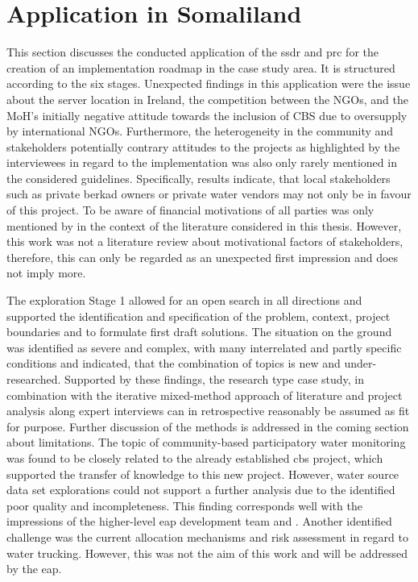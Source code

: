 \section{Application in Somaliland}

This section discusses the conducted application of the \acrshort{ssdr} and \acrshort{prc} for the creation of an implementation roadmap in the case study area. It is structured according to the six stages. Unexpected findings in this application were the issue about the server location in Ireland, the competition between the NGOs, and the MoH's initially negative attitude towards the inclusion of CBS due to oversupply by international NGOs. Furthermore, the heterogeneity in the community and stakeholders potentially contrary attitudes to the projects as highlighted by the interviewees in regard to the implementation was also only rarely mentioned in the considered guidelines. Specifically, results indicate, that local stakeholders such as private berkad owners or private water vendors may not only be in favour of this project. To be aware of financial motivations of all parties was only mentioned by \textcite{minkmanCitizenScienceWater2015} in the context of the literature considered in this thesis. However, this work was not a literature review about motivational factors of stakeholders, therefore, this can only be regarded as an unexpected first impression and does not imply more.\newline

The exploration Stage 1 allowed for an open search in all directions and supported the identification and specification of the problem, context, project boundaries and to formulate first draft solutions. The situation on the ground was identified as severe and complex, with many interrelated and partly specific conditions and indicated, that the combination of topics is new and under-researched. Supported by these findings, the research type case study, in combination with the iterative mixed-method approach of literature and project analysis along expert interviews can in retrospective reasonably be assumed as fit for purpose. Further discussion of the methods is addressed in the coming section about limitations.\newline
The topic of community-based participatory water monitoring was found to be closely related to the already established \acrshort{cbs} project, which supported the transfer of knowledge to this new project. However, water source data set explorations could not support a further analysis due to the identified poor quality and incompleteness. This finding corresponds well with the impressions of the higher-level \acrshort{eap} development team and \autocite{harrowsmithFutureForecastImpact2020}. Another identified challenge was the current allocation mechanisms and risk assessment in regard to water trucking. However, this was not the aim of this work and will be addressed by the \acrshort{eap}.

